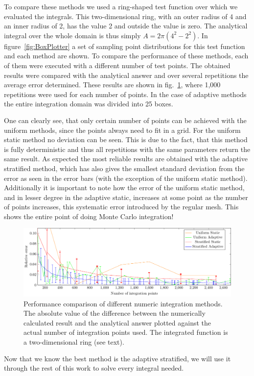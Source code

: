 To compare these methods we used a ring-shaped test function over which we evaluated the integrals. This two-dimensional ring, with an outer radius of 4 and an inner radius of 2, has the value 2 and outside the value is zero. The analytical integral over the whole domain is thus simply $ A=2\pi (4^2-2^2)$.  In figure~\ref{fig:BoxPlotter} a set of sampling point distributions for this test function and each method are shown. To compare the performance of these methods, each of them were executed with a different number of test points. The obtained results were compared with the analytical answer and over several repetitions the average error determined. These results are shown in fig.~\ref{fig:MCerrs}, where 1,000 repetitions were used for each number of points. In the case of adaptive methods the entire integration domain was divided into 25 boxes.

One can clearly see, that only certain number of points can be achieved with the uniform methods, since the points always need to fit in a grid. For the uniform static method no deviation can be seen. This is due to the fact, that this method is fully deterministic and thus all repetitions with the same parameters return the same result.
As expected the most reliable results are obtained with the adaptive stratified method, which has also gives the smallest standard deviation from the error as seen in the error bars (with the exception of the uniform static method).
Additionally it is important to note how the error of the uniform static method, and in lesser degree in the adaptive static, increases at some point as the number of points increases, this systematic error introduced by the regular mesh. This shows the entire point of doing Monte Carlo integration!
\begin{figure}[th]
  \begin{center}
  \includegraphics[scale=0.9]{graphs/integration_test_ring.pdf}
  \caption{
  	Performance comparison of different numeric integration methods. The absolute value of the difference between the numerically calculated result and the analytical answer plotted against the actual number of integration points used. The integrated function is a two-dimensional ring (see text).
  	}
  \label{fig:MCerrs}
  \end{center}
\end{figure}

Now that we know the best method is the adaptive stratified, we will use it through the rest of this work to solve every integral needed.
